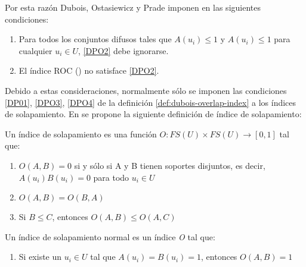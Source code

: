 Por esta razón Dubois, Ostasiewicz y Prade imponen en \cite{dubois2000} las siguientes condiciones:
\begin{enumerate}[label=(\arabic*),ref=(\arabic*)]
\item Para todos los conjuntos difusos tales que $A(u_{i}) \le 1$ y $A(u_{i}) \le 1$ para cualquier $u_{i} \in U$, \ref{DPO2} debe ignorarse.
\item El índice ROC (\cite{dubois2000}) no satisface \ref{DPO2}.
\end{enumerate}
Debido a estas consideraciones, normalmente sólo se imponen las condiciones \ref{DP01}, \ref{DPO3}, \ref{DPO4} de la definición \ref{def:dubois-overlap-index} a los índices de solapamiento.
En \cite{bustince2013overlap} se propone la siguiente definición de índice de solapamiento:
\begin{definition}\label{def:bustince-overlap-index}
Un índice de solapamiento es una función $O : FS(U) \times FS(U) \rightarrow [0,1]$ tal que:
\begin{enumerate}[label=(O\arabic*),ref=(O\arabic*)]
\item $O(A,B) = 0$ si y sólo si A y B tienen soportes disjuntos, es decir, $A(u_{i})B(u_{i}) = 0$ para todo $u_{i} \in U$\label{BO1}
\item $O(A,B) = O(B,A)$\label{BO2}
\item Si $B \leq C$, entonces $O(A,B) \leq O(A,C)$\label{BO3}
\end{enumerate}
Un índice de solapamiento normal es un índice \emph{O} tal que:
\begin{enumerate}[label=(O4),ref=(O4)]
\item Si existe un $u_{i} \in U$ tal que $A(u_{i}) = B(u_{i}) = 1$, entonces $O(A,B) = 1$\label{BO4}
\end{enumerate}
\end{definition}
